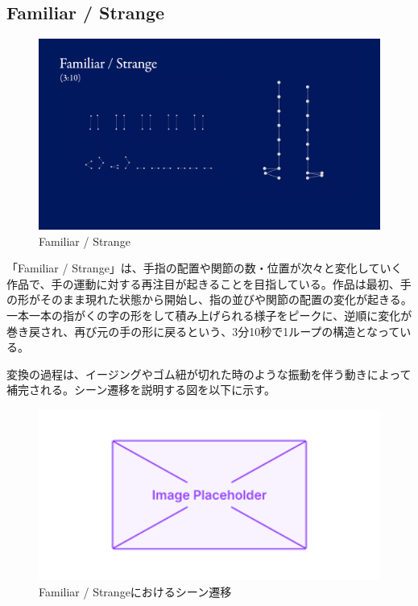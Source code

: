 \subsection*{Familiar / Strange}
\begin{figure}[H]
  \centering
  \includegraphics[width=15cm]{img/fs-02.png}
  \caption{Familiar / Strange}
  \label{fig:familiar_strange}
\end{figure}
「Familiar / Strange」は、手指の配置や関節の数・位置が次々と変化していく作品で、手の運動に対する再注目が起きることを目指している。作品は最初、手の形がそのまま現れた状態から開始し、指の並びや関節の配置の変化が起きる。一本一本の指がくの字の形をして積み上げられる様子をピークに、逆順に変化が巻き戻され、再び元の手の形に戻るという、3分10秒で1ループの構造となっている。


変換の過程は、イージングやゴム紐が切れた時のような振動を伴う動きによって補完される。シーン遷移を説明する図を以下に示す。
\begin{figure}[H]
  \centering
  \includegraphics[width=15cm]{img/placeholder.png}
  \caption{Familiar / Strangeにおけるシーン遷移}
  \label{fig:diagram_familiar_strange}
\end{figure}

